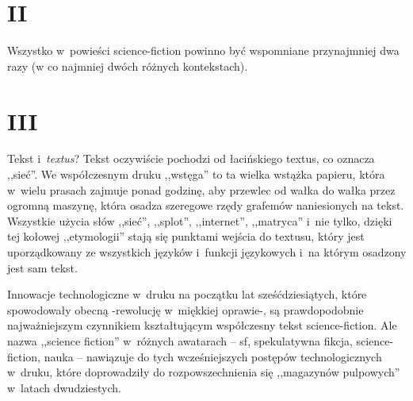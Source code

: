 \documentclass[oneside,polish,11pt,rmheadings]{mwbk}
\begin{document}
\section*{II}

Wszystko w~powieści science-fiction powinno być wspomniane przynajmniej dwa razy (w co najmniej dwóch różnych kontekstach). 

\section*{III}

Tekst i~\textit{textus}? Tekst oczywiście pochodzi od łacińskiego textus, co oznacza ,,sieć''. We współczesnym druku ,,wstęga'' to ta wielka wstążka papieru, która w~wielu prasach zajmuje ponad godzinę, aby przewlec od wałka do wałka przez ogromną maszynę, która osadza szeregowe rzędy grafemów naniesionych na tekst. Wszystkie użycia słów ,,sieć'', ,,splot'', ,,internet'', ,,matryca'' i~nie tylko, dzięki tej kołowej ,,etymologii'' stają się punktami wejścia do textusu, który jest uporządkowany ze wszystkich języków i~funkcji językowych i~na którym osadzony jest sam tekst. 

Innowacje technologiczne w~druku na początku lat sześćdziesiątych, które spowodowały obecną -rewolucję w~miękkiej oprawie-, są prawdopodobnie najważniejszym czynnikiem kształtującym współczesny tekst science-fiction. Ale nazwa ,,science fiction'' w~różnych awatarach -- sf, spekulatywna fikcja, science-fiction, nauka -- nawiązuje do tych wcześniejszych postępów technologicznych w~druku, które doprowadziły do rozpowszechnienia się ,,magazynów pulpowych'' w~latach dwudziestych. 
\end{document}
